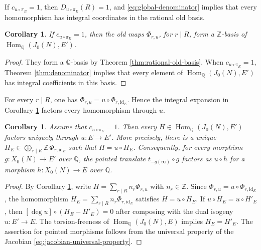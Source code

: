 \documentclass[12pt, letterpaper]{amsart}
\newtheorem{corollary}[theorem]{Corollary}
\theoremstyle{definition}
\theoremstyle{remark}
\newcommand{\Q}{\mathbb Q}
\newcommand{\Z}{\mathbb Z}
\newcommand{\Hom}{\operatorname{Hom}}
\numberwithin{equation}{section}
\begin{document}
If \(c_{u\circ\pi_E}=1\), then \(D_{u\circ\pi_E}(R)=1\), and
\eqref{eq:global-denominator} implies that every homomorphism has integral
coordinates in the rational old basis.

\begin{corollary}\label{cor:saturation}
If \(c_{u\circ\pi_E}=1\), then the old maps \(\Phi_{r,u}\), for \(r\mid R\),
form a \(\Z\)-basis of \(\Hom_\Q(J_0(N),E')\).
\end{corollary}

\begin{proof}
They form a \(\Q\)-basis by Theorem \ref{thm:rational-old-basis}. When
\(c_{u\circ\pi_E}=1\),
Theorem \ref{thm:denominator} implies that every element of
\(\Hom_\Q(J_0(N),E')\) has integral coefficients in this basis.
\end{proof}

For every \(r\mid R\), one has
\(\Phi_{r,u}=u\circ\Phi_{r,\mathrm{id}_E}\). Hence the integral expansion in
Corollary \ref{cor:saturation} factors every homomorphism through \(u\).

\begin{corollary}\label{cor:factor-through-u}
Assume that \(c_{u\circ\pi_E}=1\). Then every
\(H\in\Hom_\Q(J_0(N),E')\) factors uniquely through \(u:E\to E'\). More precisely,
there is a unique
\(H_E\in \bigoplus_{r\mid R}\Z\,\Phi_{r,\mathrm{id}_E}\) such that
\(H=u\circ H_E\). Consequently, for every morphism
\(g:X_0(N)\to E'\) over \(\Q\), the pointed translate
\(t_{-g(\infty)}\circ g\) factors as \(u\circ h\) for a morphism
\(h:X_0(N)\to E\) over \(\Q\).
\end{corollary}

\begin{proof}
By Corollary \ref{cor:saturation}, write
\(H=\sum_{r\mid R}n_r\Phi_{r,u}\) with \(n_r\in\Z\). Since
\(\Phi_{r,u}=u\circ\Phi_{r,\mathrm{id}_E}\), the homomorphism
\(H_E=\sum_{r\mid R}n_r\Phi_{r,\mathrm{id}_E}\) satisfies \(H=u\circ H_E\). If
\(u\circ H_E=u\circ H'_E\), then
\([\deg u]\circ(H_E-H'_E)=0\) after composing with the dual isogeny
\(\widehat u:E'\to E\). The torsion-freeness of
\(\Hom_\Q(J_0(N),E)\) implies \(H_E=H'_E\). The assertion for pointed morphisms
follows from the universal
property of the Jacobian \eqref{eq:jacobian-universal-property}.
\end{proof}
\end{document}
